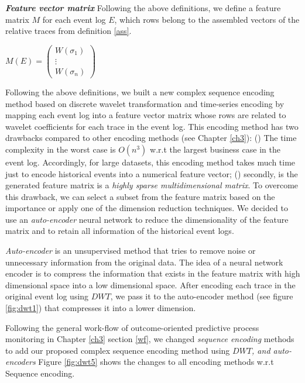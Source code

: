 \begin{definition}{\textit{\textbf{Feature vector matrix}}}
 	Following the above definitions, we define a feature matrix $M$ for each event log $E$, which rows belong to the assembled vectors of the relative traces from definition \ref{ass}. 	
 	\begin{center}
 		$M(E) = \begin{pmatrix}
 		W(\sigma_1) \\
 		\vdots\\
 		W(\sigma_n)
 		\end{pmatrix} $
 	\end{center}
\end{definition}
 
Following the above definitions, we built a new complex sequence encoding method based on discrete wavelet transformation and time-series encoding by mapping each event log into a feature vector matrix whose rows are related to wavelet coefficients for each trace in the event log. This encoding method has two drawbacks compared to other encoding methods (see Chapter \ref{ch3}): () The time complexity in the worst case is $O(n^3)$ w.r.t the largest business case in the event log. Accordingly, for large datasets, this encoding method takes much time just to encode historical events into a numerical feature vector; () secondly, is the generated feature matrix is a \textit{highly sparse multidimensional matrix}. To overcome this drawback, we can select a subset from the feature matrix based on the importance or apply one of the dimension reduction techniques.  We decided to use an \textit{auto-encoder} neural network to reduce the dimensionality of the feature matrix and to retain all information of the historical event logs. 

\textit{Auto-encoder} is an unsupervised method that tries to remove noise or unnecessary information from the original data. The idea of a neural network encoder is to compress the information that exists in the feature matrix with high dimensional space into a low dimensional space.  After encoding each trace in the original event log using $DWT$, we pass it to the auto-encoder method (see figure \ref{fig:dwt1}) that compresses it into a lower dimension. 


Following the general work-flow of outcome-oriented predictive process monitoring in Chapter \ref{ch3} section \ref{wf}, we changed \textit{sequence encoding} methods to add our proposed complex sequence encoding method using \textit{$DWT$, and auto-encoders} Figure \ref{fig:dwt5} shows the changes to all encoding methods w.r.t Sequence encoding.

